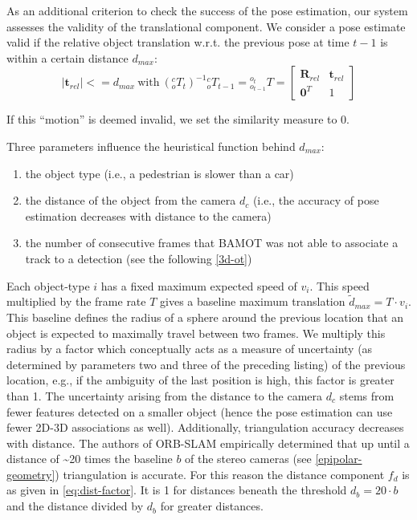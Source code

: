 \documentclass[headsepline, hidelinks, footsepline, footinclude=false, oneside, fontsize=11pt, paper=a4, listof=totoc, bibliography=totoc]{scrbook}
\begin{document}
As an additional criterion to check the success of the pose estimation, our system assesses the validity of the translational component.
We consider a pose estimate valid if the relative object translation w.r.t. the previous pose at time \(t-1\) is within a certain distance \(d_{max}\):
\begin{equation}
|\mathbf{t}_{rel}| <= d_{max} ~ \text{with} ~ ({}^{c}_{o}T_t)^{-1}{}^{c}_{o}T_{t-1}={}^{o_t}_{o_{t-1}}T = \begin{bmatrix}\mathbf{R}_{rel} & \mathbf{t}_{rel} \\ \mathbf{0}^T & 1 \end{bmatrix}
\end{equation}

If this ``motion'' is deemed invalid, we set the similarity measure to 0.

Three parameters influence the heuristical function behind \(d_{max}\): 

\begin{enumerate}
\item the object type (i.e., a pedestrian is slower than a car)
\item the distance of the object from the camera \(d_c\) (i.e., the accuracy of pose estimation decreases with distance to the camera)
\item the number of consecutive frames that BAMOT was not able to associate a track to a detection (see the following \cref{3d-ot})
\end{enumerate}

Each object-type \(i\) has a fixed maximum expected speed of \(v_i\). 
This speed multiplied by the frame rate \(T\) gives a baseline maximum translation \(\tilde{d}_{max} = T \cdot v_i\).
This baseline defines the radius of a sphere around the previous location that an object is expected to maximally travel between two frames.
We multiply this radius by a factor which conceptually acts as a measure of uncertainty (as determined by parameters two and three of the preceding listing) of the previous location, 
e.g., if the ambiguity of the last position is high, this factor is greater than 1.
The uncertainty arising from the distance to the camera \(d_c\) stems from fewer features detected on a smaller object (hence the pose estimation can use fewer 2D-3D associations as well). Additionally, 
triangulation accuracy decreases with distance. The authors of ORB-SLAM \cite{mur-artalORBSLAMVersatileAccurate2015a,mur-artalORBSLAM2OpenSourceSLAM2017} empirically determined that up until a distance of \textasciitilde{}20 times the baseline \(b\) of the stereo cameras (see \cref{epipolar-geometry})
triangulation is accurate. For this reason the distance component \(f_d\) is as given in \cref{eq:dist-factor}. It is 1 for distances beneath the threshold \(d_b = 20 \cdot b\) and the distance divided by \(d_b\) 
for greater distances. 
\end{document}
